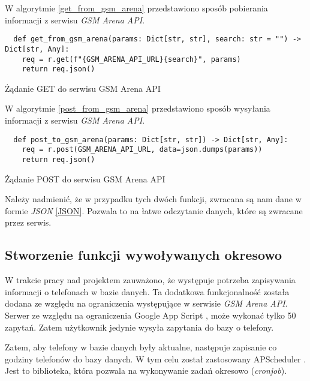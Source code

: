 W algorytmie \ref{get_from_gsm_arena} przedstawiono sposób pobierania informacji z serwisu \textit{GSM Arena API}.

\begin{code}[H]
  \begin{verbatim}
  def get_from_gsm_arena(params: Dict[str, str], search: str = "") -> Dict[str, Any]:
    req = r.get(f"{GSM_ARENA_API_URL}{search}", params)
    return req.json()
  \end{verbatim}
  \caption{Żądanie GET do serwisu GSM Arena API}
  \label{get_from_gsm_arena}
\end{code}

W algorytmie \ref{post_from_gsm_arena} przedstawiono sposób wysyłania informacji z serwisu \textit{GSM Arena API}.
\begin{code}[H]
  \begin{verbatim}
  def post_to_gsm_arena(params: Dict[str, str]) -> Dict[str, Any]:
    req = r.post(GSM_ARENA_API_URL, data=json.dumps(params))
    return req.json()
  \end{verbatim}
  \caption{Żądanie POST do serwisu GSM Arena API}
  \label{post_from_gsm_arena}
\end{code}

Należy nadmienić, że w przypadku tych dwóch funkcji, zwracana są nam dane w formie \textit{JSON} \ref{JSON}. Pozwala to na łatwe odczytanie danych, które są zwracane przez serwis.

\subsection{Stworzenie funkcji wywoływanych okresowo}
W trakcie pracy nad projektem zauważono, że występuje potrzeba zapisywania informacji o telefonach w bazie danych. Ta dodatkowa funkcjonalność została dodana ze względu na ograniczenia występujące w serwisie \textit{GSM Arena API}. Serwer ze względu na ograniczenia Google App Script \cite{google_app_script}, może wykonać tylko 50 zapytań. Zatem użytkownik jedynie wysyła zapytania do bazy o telefony.

Zatem, aby telefony w bazie danych były aktualne, następuje zapisanie co godziny telefonów do bazy danych. W tym celu został zastosowany APScheduler \cite{flask_apscheduler}. Jest to biblioteka, która pozwala na wykonywanie zadań okresowo (\textit{cronjob}).

